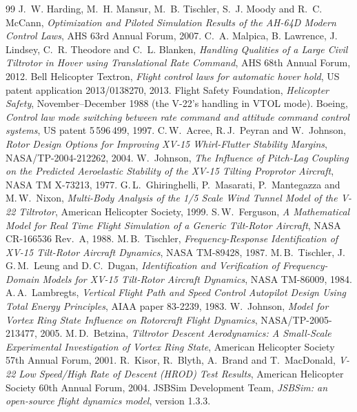 \documentclass[10pt,a4paper,twocolumn]{article}
\begin{document}
\begin{thebibliography}{99}
 J.~W. Harding, M.~H. Mansur, M.~B. Tischler, S.~J. Moody and R.~C. McCann, \emph{Optimization and Piloted Simulation
Results of the AH-64D Modern Control Laws}, AHS 63rd Annual Forum, 2007.
 C.~A. Malpica, B. Lawrence, J. Lindsey, C.~R. Theodore and C.~L. Blanken, \emph{Handling Qualities of a Large Civil
Tiltrotor in Hover using Translational Rate Command}, AHS 68th Annual Forum, 2012.
 Bell Helicopter Textron, \emph{Flight control laws for automatic hover hold}, US patent application 2013/0138270, 2013.
 Flight Safety Foundation, \emph{Helicopter Safety}, November--December 1988 (the V-22's handling in VTOL mode).
 Boeing, \emph{Control law mode switching between rate command and attitude command control systems}, US patent 5\,596\,499, 1997.
 C.\,W.\ Acree, R.\,J.\ Peyran and W.\ Johnson, \emph{Rotor Design Options for Improving XV-15 Whirl-Flutter Stability Margins}, NASA/TP-2004-212262, 2004.
 W.\ Johnson, \emph{The Influence of Pitch-Lag Coupling on the Predicted Aeroelastic Stability of the XV-15 Tilting Proprotor Aircraft}, NASA TM X-73213, 1977.
 G.\,L.\ Ghiringhelli, P.\ Masarati, P.\ Mantegazza and M.\,W.\ Nixon, \emph{Multi-Body Analysis of the 1/5 Scale Wind Tunnel Model of the V-22 Tiltrotor}, American Helicopter Society, 1999.
 S.\,W.\ Ferguson, \emph{A Mathematical Model for Real Time Flight Simulation of a Generic Tilt-Rotor Aircraft}, NASA CR-166536 Rev.\ A, 1988.
 M.\,B.\ Tischler, \emph{Frequency-Response Identification of XV-15 Tilt-Rotor Aircraft Dynamics}, NASA TM-89428, 1987.
 M.\,B.\ Tischler, J.\,G.\,M.\ Leung and D.\,C.\ Dugan, \emph{Identification and Verification of Frequency-Domain Models for XV-15 Tilt-Rotor Aircraft Dynamics}, NASA TM-86009, 1984.
 A.\,A.\ Lambregts, \emph{Vertical Flight Path and Speed Control Autopilot Design Using Total Energy Principles}, AIAA paper 83-2239, 1983.
 W.\ Johnson, \emph{Model for Vortex Ring State Influence on Rotorcraft Flight Dynamics}, NASA/TP-2005-213477, 2005.
 M.\,D.\ Betzina, \emph{Tiltrotor Descent Aerodynamics: A Small-Scale Experimental Investigation of Vortex Ring State}, American Helicopter Society 57th Annual Forum, 2001.
 R.\ Kisor, R.\ Blyth, A.\ Brand and T.\ MacDonald, \emph{V-22 Low Speed/High Rate of Descent (HROD) Test Results}, American Helicopter Society 60th Annual Forum, 2004.
 JSBSim Development Team, \emph{JSBSim: an open-source flight dynamics model}, version 1.3.3.
\end{thebibliography}
\end{document}
